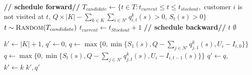\documentclass{article}
\begin{document}
\begin{algorithm}[H]
\captionsetup{labelformat=empty}
\caption{\textbf{Find Feasible Visit Time}($t_{current}$, $t_{Stockout}$, $i$)}
\label{alg:FindVisitTime}
\begin{algorithmic}[1]
        \STATE \textbf{// schedule forward//}
        \STATE $T_{candidate}\gets\{t\in T:  t_{current}\leq t \leq t_{stockout},$
        \STATE \hspace{9em}  customer $i$ is not visited at $t$, 
        \STATE \hspace{9em}  $Q\times |K| - \sum_{k\in K}\sum_{i\in N'} q^k_{i,t}(s) > 0$,
        \STATE \hspace{9em}  $S_t(s) > 0\}$
        \RETURN $t \sim \textsc{Random}(T_{candidate})$
        \ELSE
            \STATE $t_{current} \gets t_{Stockout} +1$
        \ENDIF
    \ELSE
        \STATE \textbf{// schedule backward//}         
                        \RETURN $t$
                    \ENDIF
                \ENDIF
            \ENDFOR
            \RETURN $\emptyset$
    \ENDIF
\ENDWHILE
\end{algorithmic}
\end{algorithm}




\begin{algorithm}[H]
\captionsetup{labelformat=empty}
\caption{\textbf{Find Vehicle To Deliver Max}($t$, $i$, $s$)}
\label{alg:FindVehicleToDeliverMax}
\begin{algorithmic}[1]
\STATE $k'\gets |K|+1$, $q'\gets 0$, 
        \STATE $q\gets \max\{0,\min\{S_1(s), Q-\sum_{j\in N'}q^k_{j,1}(s), U_{i}-I_{i,0}\}\}$
    \ELSE
        \STATE $q\gets \max\{0,\min\{S_t(s), Q-\sum_{j\in N'}q^k_{j,t}(s), U_{i}-I_{i,t-1}(s)\}\}$
    \ENDIF
        \STATE $q' \gets q$, $k'\gets k$
    \ENDIF
\ENDFOR
\RETURN $k',q'$
\end{algorithmic}
\end{algorithm}
\end{document}
